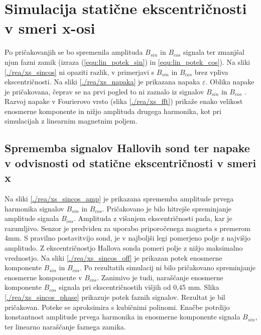 \section{Simulacija statične ekscentričnosti v smeri x-osi}
Po pričakovanjih se bo spremenila amplituda $B_{sin}$ in $B_{cos}$ signala ter zmanjšal njun fazni zamik (izraza (\ref{equ:lin_potek_sin}) in \ref{equ:lin_potek_cos}). Na sliki \ref{./rea/xs_sincos} ni opaziti razlik, v primerjavi s $B_{sin}$ in $B_{cos}$ brez vpliva ekscentričnosti. Na sliki \ref{./rea/xs_napaka} je prikazana napaka $\varepsilon$. Oblika napake je pričakovana, čeprav se na prvi pogled to ni zaznalo iz signalov $B_{sin}$ in $B_{cos}$ \cite{AM8192}. Razvoj napake v Fourierovo vrsto (slika \ref{./rea/xs_fft}) prikaže enako velikost enosmerne komponente in nižjo amplituda drugega harmonika, kot pri simulacijah z linearnim magnetnim poljem.
\newpage
\subsection{Sprememba signalov Hallovih sond ter napake v odvisnosti od statične ekscentričnosti v smeri x}
Na sliki \ref{./rea/xs_sincos_amp} je prikazana sprememba amplitude prvega harmonika signalov $B_{sin}$ in $B_{cos}$. Pričakovano je bilo hitrejše spreminjanje amplitude signala $B_{cos}$. Amplituda z višanjem ekscentričnosti pada, kar je razumljivo. Senzor je predviden za uporabo priporočenega magneta s premerom 4mm. S pravilno postavitvijo sond, je v najboljši legi pomerjeno polje z najvišjo amplitudo. Z ekscentričnostjo Hallova sonda pomeri polje z nižjo maksimalno vrednostjo. Na sliki \ref{./rea/xs_sincos_off} je prikazan potek enosmerne komponente $B_{sin}$ in $B_{cos}$. Po rezultatih simulacij ni bilo pričakovano spreminjanje enosmerne komponente v $B_{cos}$. Zanimivo je tudi, naraščanje enosmerne komponente $B_{cos}$ signala pri ekscentričnostih višjih od 0,45 mm. Slika \ref{./rea/xs_sincos_phase} prikazuje potek faznih signalov. Rezultat je bil pričakovan.
Poteke se aproksimira s kubičnimi polinomi. Enačbe potrdijo konstantnost amplitude prvega harmonika in enosmerne komponente signala $B_{sin}$, ter linearno naraščanje faznega zamika.

